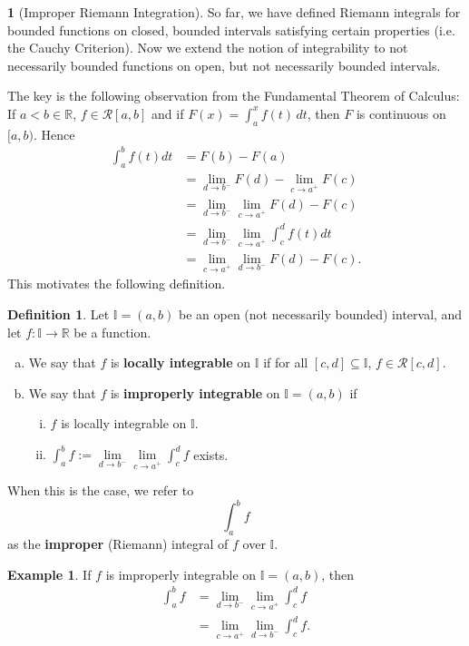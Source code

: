 \documentclass[11pt]{article}
\theoremstyle{definition}
\newtheorem{defn}[thm]{Definition}
\newtheorem{exmp}[thm]{Example}
\newtheorem{none}[thm]{}
\newcommand{\mbR}{\ensuremath{\mathbb{R}}}
\begin{document}
\begin{none}[Improper Riemann Integration]
So far, we have defined Riemann integrals for bounded functions on closed, bounded intervals satisfying certain properties (i.e. the Cauchy Criterion). Now we extend the notion of integrability to not necessarily bounded functions on open, but not necessarily bounded intervals. 

The key is the following observation from the Fundamental Theorem of Calculus: 
If $a < b \in \mbR$, $f \in \mathcal{R}[a, b]$ and if $F(x) = \int_a^x f(t)\,dt$, then $F$ is continuous on $[a, b)$. Hence
\begin{align*}
\int_a^b f(t)dt & = F(b) - F(a) \\
& = \lim_{d\to b^-} F(d) - \lim_{c\to a^+} F(c) \\
& = \lim_{d\to b^-} \lim_{c\to a^+} F(d) - F(c) \\
& = \lim_{d\to b^-} \lim_{c\to a^+} \int_c^d f(t)dt \\
& = \lim_{c\to a^+} \lim_{d\to b^-} F(d) - F(c) \text{.}
\end{align*}
This motivates the following definition.
\end{none}

\begin{defn}
Let $\mathbb{I} = (a, b)$ be an open (not necessarily bounded) interval, and let $f : \mathbb{I} \to \mbR$ be a function.
\begin{enumerate}[(a)] \vspace{-0.2cm}
\item We say that $f$ is \textbf{locally integrable} on $\mathbb{I}$ if for all $[c, d] \subseteq \mathbb{I}$, $f \in \mathcal{R}[c, d]$. 
\item We say that $f$ is \textbf{improperly integrable} on $\mathbb{I} = (a, b)$ if
\begin{enumerate}[(i)]
\item $f$ is locally integrable on $\mathbb{I}$.
\item $\displaystyle\int_a^b f := \lim\limits_{d\to b^-} \lim\limits_{c\to a^+} \displaystyle\int_c^d f$ exists.
\end{enumerate}
\end{enumerate}
When this is the case, we refer to
$$\int_a^b f$$
as the \textbf{improper} (Riemann) integral of $f$ over $\mathbb{I}$. 
\end{defn}

\begin{exmp}
If $f$ is improperly integrable on $\mathbb{I} = (a, b)$, then
\begin{align*}
\int_a^b f & = \lim_{d\to b^-} \lim_{c\to a^+} \int_c^d f \\
& = \lim_{c\to a^+} \lim_{d\to b^-} \int_c^d f \text{.}
\end{align*}
\end{exmp}
\end{document}

